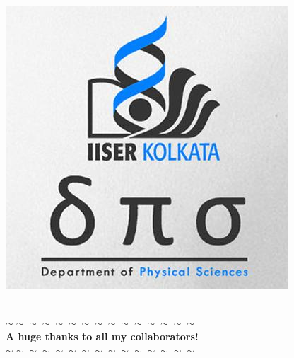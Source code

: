 \documentclass[aspectratio=169]{beamer}
\begin{document}
\begin{frame}{}
\begin{minipage}{0.1\textwidth}
	\includegraphics[width=\textwidth]{dps_logo.jpeg}
\end{minipage}
\hspace*{\fill}
\\
\vspace*{\fill}
\alert{\bf $\sim\sim\sim\sim\sim\sim\sim\sim\sim\sim\sim\sim\sim\sim\sim$ }\\
\alert{\bf A huge thanks to all my collaborators! }\\
\alert{\bf $\sim\sim\sim\sim\sim\sim\sim\sim\sim\sim\sim\sim\sim\sim\sim$ }\\
\vspace*{\fill}


\end{frame}
\end{document}
